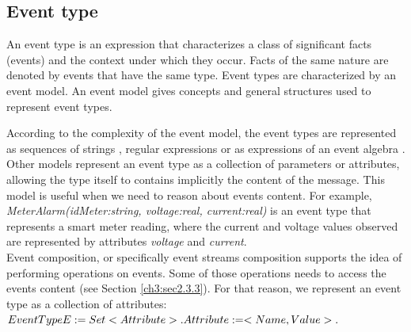  \subsection{Event type}
 An event type is an expression that characterizes a class of significant facts (events) and the context under which they occur. Facts of the same nature are denoted by events that have the same type. Event types are characterized by an event model. An event model gives concepts and general structures used to represent event types.

According to the complexity of the event model, the event types are represented as sequences of strings \cite{Yuhara1994}, regular expressions \cite{Bailey1994} or as expressions of an event algebra \cite{Chakravarthy1994, Gatziu1994, Collet96}. Other models represent an event type as a collection of parameters or attributes, allowing the type itself to contains implicitly the content of the message. This model is useful when we need to reason about events content. For example, \textit{MeterAlarm(idMeter:string, voltage:real, current:real)} is an event type that represents a smart meter reading, where the current and voltage values observed are represented by attributes \textit{voltage} and \textit{current}.\\
Event composition, or specifically event streams composition supports the idea of performing operations on events. Some of those operations needs to access the events content (see Section \ref{ch3:sec2.3.3}). 
For that reason, we represent an event type as a collection of attributes:\\
$EventType E:= Set <Attribute>. \\
Attribute:= <Name, Value>.
$

